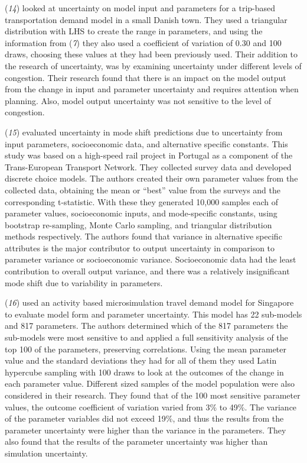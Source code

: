 \documentclass[
  letterpaper,
]{trb}
\begin{document}
(\emph{14}) looked at uncertainty on model input and parameters for a
trip-based transportation demand model in a small Danish town. They used
a triangular distribution with LHS to create the range in parameters,
and using the information from (\emph{7}) they also used a coefficient
of variation of 0.30 and 100 draws, choosing these values at they had
been previously used. Their addition to the research of uncertainty, was
by examining uncertainty under different levels of congestion. Their
research found that there is an impact on the model output from the
change in input and parameter uncertainty and requires attention when
planning. Also, model output uncertainty was not sensitive to the level
of congestion.

(\emph{15}) evaluated uncertainty in mode shift predictions due to
uncertainty from input parameters, socioeconomic data, and alternative
specific constants. This study was based on a high-speed rail project in
Portugal as a component of the Trans-European Transport Network. They
collected survey data and developed discrete choice models. The authors
created their own parameter values from the collected data, obtaining
the mean or ``best'' value from the surveys and the corresponding
t-statistic. With these they generated 10,000 samples each of parameter
values, socioeconomic inputs, and mode-specific constants, using
bootstrap re-sampling, Monte Carlo sampling, and triangular distribution
methods respectively. The authors found that variance in alternative
specific attributes is the major contributor to output uncertainty in
comparison to parameter variance or socioeconomic variance.
Socioeconomic data had the least contribution to overall output
variance, and there was a relatively insignificant mode shift due to
variability in parameters.

(\emph{16}) used an activity based microsimulation travel demand model
for Singapore to evaluate model form and parameter uncertainty. This
model has 22 sub-models and 817 parameters. The authors determined which
of the 817 parameters the sub-models were most sensitive to and applied
a full sensitivity analysis of the top 100 of the parameters, preserving
correlations. Using the mean parameter value and the standard deviations
they had for all of them they used Latin hypercube sampling with 100
draws to look at the outcomes of the change in each parameter value.
Different sized samples of the model population were also considered in
their research. They found that of the 100 most sensitive parameter
values, the outcome coefficient of variation varied from 3\% to 49\%.
The variance of the parameter variables did not exceed 19\%, and thus
the results from the parameter uncertainty were higher than the variance
in the parameters. They also found that the results of the parameter
uncertainty was higher than simulation uncertainty.
\end{document}
